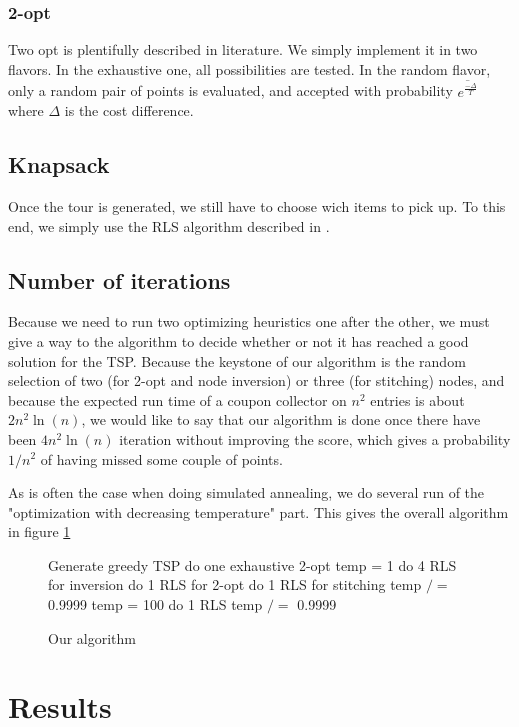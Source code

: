 \documentclass[fontsize=9pt,twocolumns,enabledeprecatedfontcommands]{scrartcl}
\begin{document}
\subsubsection{2-opt}
Two opt is plentifully described in literature. We simply implement it in two flavors. In the exhaustive one, all possibilities are tested. In the random flavor, only a random pair of points is evaluated, and accepted with probability $\overline{e^{\frac{-\Delta}{T}}}$ where $\Delta$ is the cost difference.

\subsection{Knapsack}
Once the tour is generated, we still have to choose wich items to pick up. To this end, we simply use the RLS algorithm described in \cite{Polyakovskiy}.

\subsection{Number of iterations}
Because we need to run two optimizing heuristics one after the other, we must give a way to the algorithm to decide whether or not it has reached a good solution for the TSP. Because the keystone of our algorithm is the random selection of two (for 2-opt and node inversion) or three (for stitching) nodes, and because the expected run time of a coupon collector on $n^2$ entries is about $2n^2\ln(n)$, we would like to say that our algorithm is done once there have been $4n^2\ln(n)$ iteration without improving the score, which gives a probability $1/n^2$ of having missed some couple of points.

As is often the case when doing simulated annealing, we do several run of the "optimization with decreasing temperature" part. This gives the overall algorithm in figure \ref{algo}

\begin{figure}
\begin{algorithmic}
	\State Generate greedy TSP
	\State do one exhaustive 2-opt
	\State temp = 1
	\State do 4 RLS for inversion
	\State do 1 RLS for 2-opt
	\State do 1 RLS for stitching
	\State temp $/=$ 0.9999
	\EndWhile
	\EndFor
{}
\State temp = 100	
	\State do 1 RLS
	\State temp $/=$ 0.9999
	\EndWhile
	\EndFor

\end{algorithmic}
\label{algo}
\caption{Our algorithm}
\end{figure} 

\section{Results}






\end{document}
